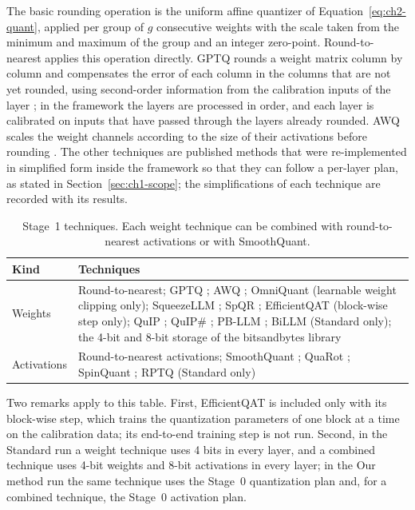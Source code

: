 The basic rounding operation is the uniform affine quantizer of Equation~\ref{eq:ch2-quant}, applied per group of $g$ consecutive weights with the scale taken from the minimum and maximum of the group and an integer zero-point. Round-to-nearest applies this operation directly. GPTQ rounds a weight matrix column by column and compensates the error of each column in the columns that are not yet rounded, using second-order information from the calibration inputs of the layer \cite{frantar2023gptq}; in the framework the layers are processed in order, and each layer is calibrated on inputs that have passed through the layers already rounded. AWQ scales the weight channels according to the size of their activations before rounding \cite{lin2024awq}. The other techniques are published methods that were re-implemented in simplified form inside the framework so that they can follow a per-layer plan, as stated in Section~\ref{sec:ch1-scope}; the simplifications of each technique are recorded with its results.

\begin{table}[htbp]
\centering
\small
\caption{Stage~1 techniques. Each weight technique can be combined with round-to-nearest activations or with SmoothQuant.}
\label{tab:ch4-stage1}
\renewcommand{\arraystretch}{1.2}
\begin{tabularx}{\textwidth}{lX}
\hline
\textbf{Kind} & \textbf{Techniques} \\
\hline
Weights & Round-to-nearest; GPTQ \cite{frantar2023gptq}; AWQ \cite{lin2024awq}; OmniQuant \cite{shao2024omniquant} (learnable weight clipping only); SqueezeLLM \cite{kim2024squeezellm}; SpQR \cite{dettmers2024spqr}; EfficientQAT \cite{chen2025efficientqat} (block-wise step only); QuIP \cite{chee2023quip}; QuIP\# \cite{tseng2024quipsharp}; PB-LLM \cite{shang2023pbllm}; BiLLM \cite{huang2024billm} (Standard only); the 4-bit and 8-bit storage of the bitsandbytes library \\
Activations & Round-to-nearest activations; SmoothQuant \cite{xiao2023smoothquant}; QuaRot \cite{ashkboos2024quarot}; SpinQuant \cite{liu2025spinquant}; RPTQ \cite{yuan2023rptq} (Standard only) \\
\hline
\end{tabularx}
\end{table}

Two remarks apply to this table. First, EfficientQAT is included only with its block-wise step, which trains the quantization parameters of one block at a time on the calibration data; its end-to-end training step is not run. Second, in the Standard run a weight technique uses 4 bits in every layer, and a combined technique uses 4-bit weights and 8-bit activations in every layer; in the Our method run the same technique uses the Stage~0 quantization plan and, for a combined technique, the Stage~0 activation plan.

